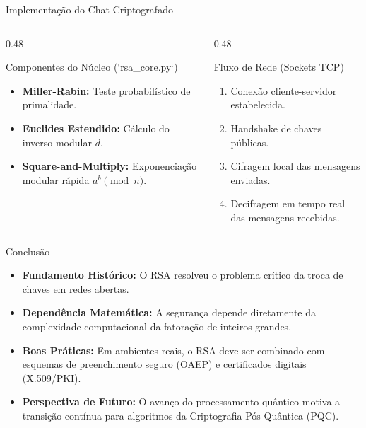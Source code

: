 \documentclass[aspectratio=169, 10pt]{beamer}
\begin{document}
\begin{frame}{Implementação do Chat Criptografado}
    \begin{columns}[T]
        \begin{column}{0.48\textwidth}
            \begin{block}{Componentes do Núcleo (`rsa\_core.py`)}
                \begin{itemize}
                    \item \textbf{Miller-Rabin:} Teste probabilístico de primalidade.
                    \item \textbf{Euclides Estendido:} Cálculo do inverso modular $d$.
                    \item \textbf{Square-and-Multiply:} Exponenciação modular rápida $a^b \pmod n$.
                \end{itemize}
            \end{block}
        \end{column}
        \begin{column}{0.48\textwidth}
            \begin{block}{Fluxo de Rede (Sockets TCP)}
                \begin{enumerate}
                    \item Conexão cliente-servidor estabelecida.
                    \item Handshake de chaves públicas.
                    \item Cifragem local das mensagens enviadas.
                    \item Decifragem em tempo real das mensagens recebidas.
                \end{enumerate}
            \end{block}
        \end{column}
    \end{columns}
\end{frame}

\begin{frame}{Conclusão}
    \begin{itemize}
        \item \textbf{Fundamento Histórico:} O RSA resolveu o problema crítico da troca de chaves em redes abertas.
        \item \textbf{Dependência Matemática:} A segurança depende diretamente da complexidade computacional da fatoração de inteiros grandes.
        \item \textbf{Boas Práticas:} Em ambientes reais, o RSA deve ser combinado com esquemas de preenchimento seguro (OAEP) e certificados digitais (X.509/PKI).
        \item \textbf{Perspectiva de Futuro:} O avanço do processamento quântico motiva a transição contínua para algoritmos da Criptografia Pós-Quântica (PQC).
    \end{itemize}
\end{frame}
\end{document}
